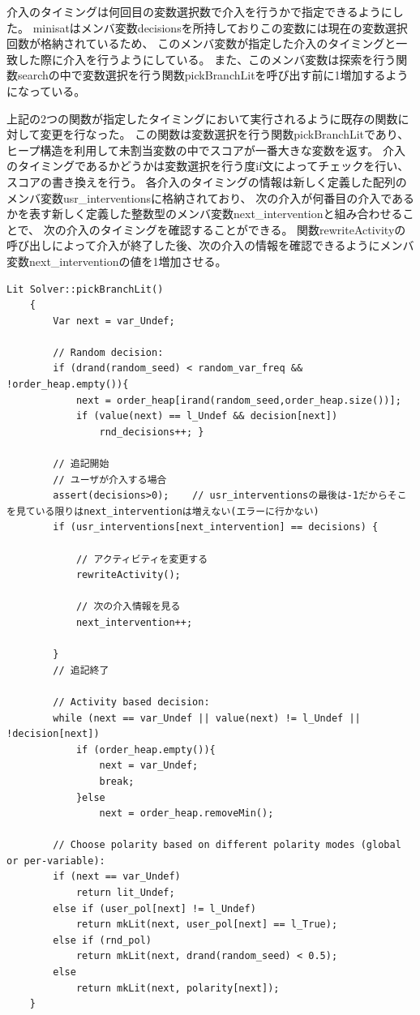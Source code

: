 介入のタイミングは何回目の変数選択数で介入を行うかで指定できるようにした。
minisatはメンバ変数decisionsを所持しておりこの変数には現在の変数選択回数が格納されているため、
このメンバ変数が指定した介入のタイミングと一致した際に介入を行うようにしている。
また、このメンバ変数は探索を行う関数searchの中で変数選択を行う関数pickBranchLitを呼び出す前に1増加するようになっている。

上記の2つの関数が指定したタイミングにおいて実行されるように既存の関数に対して変更を行なった。
この関数は変数選択を行う関数pickBranchLitであり、
ヒープ構造を利用して未割当変数の中でスコアが一番大きな変数を返す。
介入のタイミングであるかどうかは変数選択を行う度if文によってチェックを行い、スコアの書き換えを行う。
各介入のタイミングの情報は新しく定義した配列のメンバ変数usr\_interventionsに格納されており、
次の介入が何番目の介入であるかを表す新しく定義した整数型のメンバ変数next\_interventionと組み合わせることで、
次の介入のタイミングを確認することができる。
関数rewriteActivityの呼び出しによって介入が終了した後、次の介入の情報を確認できるようにメンバ変数next\_interventionの値を1増加させる。
\begin{lstlisting}[caption=関数pickBranchLitの変更による介入の追加(core/Solver.cc), firstnumber=249]
	Lit Solver::pickBranchLit()
	{
    	Var next = var_Undef;

    	// Random decision:
    	if (drand(random_seed) < random_var_freq && !order_heap.empty()){
        	next = order_heap[irand(random_seed,order_heap.size())];
        	if (value(next) == l_Undef && decision[next])
            	rnd_decisions++; }
		
		// 追記開始
		// ユーザが介入する場合
		assert(decisions>0);    // usr_interventionsの最後は-1だからそこを見ている限りはnext_interventionは増えない(エラーに行かない)
		if (usr_interventions[next_intervention] == decisions) {
			
			// アクティビティを変更する
			rewriteActivity();
			
			// 次の介入情報を見る
			next_intervention++;
			
		}
		// 追記終了

    	// Activity based decision:
    	while (next == var_Undef || value(next) != l_Undef || !decision[next])
        	if (order_heap.empty()){
        	    next = var_Undef;
        	    break;
        	}else
            	next = order_heap.removeMin();

    	// Choose polarity based on different polarity modes (global or per-variable):
    	if (next == var_Undef)
    	    return lit_Undef;
    	else if (user_pol[next] != l_Undef)
    	    return mkLit(next, user_pol[next] == l_True);
    	else if (rnd_pol)
    	    return mkLit(next, drand(random_seed) < 0.5);
    	else
    	    return mkLit(next, polarity[next]);
	}
\end{lstlisting}



